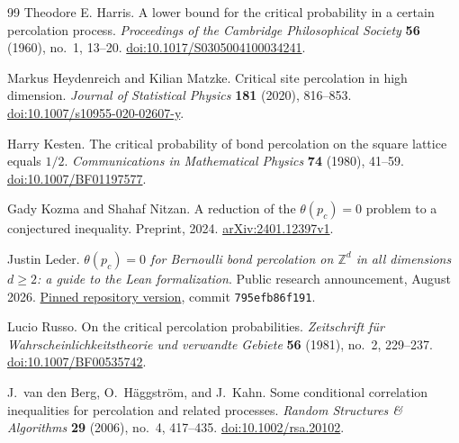 \begin{thebibliography}{99}
Theodore E. Harris.
A lower bound for the critical probability in a certain percolation process.
\emph{Proceedings of the Cambridge Philosophical Society}
\textbf{56} (1960), no.~1, 13--20.
\href{https://doi.org/10.1017/S0305004100034241}{doi:10.1017/S0305004100034241}.

Markus Heydenreich and Kilian Matzke.
Critical site percolation in high dimension.
\emph{Journal of Statistical Physics} \textbf{181} (2020), 816--853.
\href{https://doi.org/10.1007/s10955-020-02607-y}{doi:10.1007/s10955-020-02607-y}.

Harry Kesten.
The critical probability of bond percolation on the square lattice equals $1/2$.
\emph{Communications in Mathematical Physics} \textbf{74} (1980), 41--59.
\href{https://doi.org/10.1007/BF01197577}{doi:10.1007/BF01197577}.

Gady Kozma and Shahaf Nitzan.
A reduction of the $\theta(p_c)=0$ problem to a conjectured inequality.
Preprint, 2024.
\href{https://arxiv.org/abs/2401.12397v1}{arXiv:2401.12397v1}.

Justin Leder.
\emph{$\theta(p_c)=0$ for Bernoulli bond percolation on $\mathbb Z^d$
in all dimensions $d\ge2$: a guide to the Lean formalization}.
Public research announcement, August 2026.
\href{https://github.com/anthropics/formal-math/blob/795efb86f191735c5481675763537cfb4ff37e55/percolation/summary.pdf}{Pinned repository version},
commit \texttt{795efb86f191}.

Lucio Russo.
On the critical percolation probabilities.
\emph{Zeitschrift f\"ur Wahrscheinlichkeitstheorie und verwandte Gebiete}
\textbf{56} (1981), no.~2, 229--237.
\href{https://doi.org/10.1007/BF00535742}{doi:10.1007/BF00535742}.

J.~van den Berg, O.~H\"aggstr\"om, and J.~Kahn.
Some conditional correlation inequalities for percolation and related processes.
\emph{Random Structures \& Algorithms} \textbf{29} (2006), no.~4, 417--435.
\href{https://doi.org/10.1002/rsa.20102}{doi:10.1002/rsa.20102}.

\end{thebibliography}
